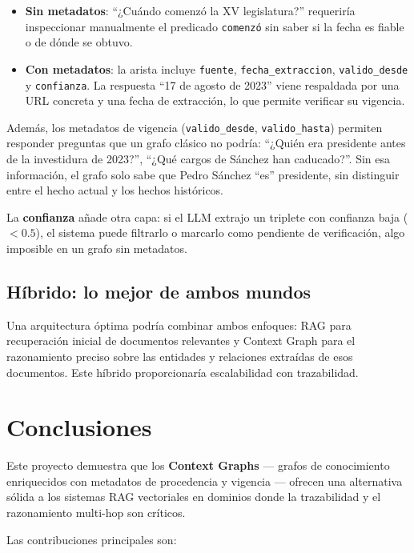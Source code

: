 \documentclass[12pt,a4paper]{article}
\begin{document}
\begin{itemize}
  \item \textbf{Sin metadatos}: ``¿Cuándo comenzó la XV legislatura?'' requeriría inspeccionar manualmente el predicado \texttt{comenzó} sin saber si la fecha es fiable o de dónde se obtuvo.
  \item \textbf{Con metadatos}: la arista incluye \texttt{fuente}, \texttt{fecha\_extraccion}, \texttt{valido\_desde} y \texttt{confianza}. La respuesta ``17 de agosto de 2023'' viene respaldada por una URL concreta y una fecha de extracción, lo que permite verificar su vigencia.
\end{itemize}

Además, los metadatos de vigencia (\texttt{valido\_desde}, \texttt{valido\_hasta}) permiten responder preguntas que un grafo clásico no podría: ``¿Quién era presidente antes de la investidura de 2023?'', ``¿Qué cargos de Sánchez han caducado?''. Sin esa información, el grafo solo sabe que Pedro Sánchez ``es'' presidente, sin distinguir entre el hecho actual y los hechos históricos.

La \textbf{confianza} añade otra capa: si el LLM extrajo un triplete con confianza baja ($< 0.5$), el sistema puede filtrarlo o marcarlo como pendiente de verificación, algo imposible en un grafo sin metadatos.

\subsection{Híbrido: lo mejor de ambos mundos}

Una arquitectura óptima podría combinar ambos enfoques: RAG para recuperación inicial de documentos relevantes y Context Graph para el razonamiento preciso sobre las entidades y relaciones extraídas de esos documentos. Este híbrido proporcionaría escalabilidad con trazabilidad.

\section{Conclusiones}
\label{sec:conclusiones}

Este proyecto demuestra que los \textbf{Context Graphs} --- grafos de conocimiento enriquecidos con metadatos de procedencia y vigencia --- ofrecen una alternativa sólida a los sistemas RAG vectoriales en dominios donde la trazabilidad y el razonamiento multi-hop son críticos.

Las contribuciones principales son:
\end{document}
